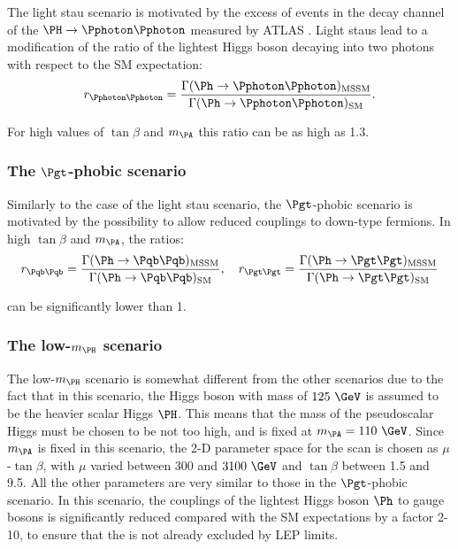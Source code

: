 The light stau scenario is motivated by the excess of events in the decay
channel of the $\PH\to\Pphoton\Pphoton$ measured by ATLAS
\cite{ATLAS-CONF-2013-012}. Light staus
lead to a modification of the ratio of the lightest Higgs boson decaying into
two photons with respect to the \ac{SM} expectation:
\begin{equation}
r_{\Pphoton\Pphoton} =
\frac{\Gamma(\Ph\to\Pphoton\Pphoton)_{\text{MSSM}}}{\Gamma(\Ph\to\Pphoton\Pphoton)_{\text{SM}}}
.
\end{equation}

For high values of $\tan\beta$ and $m_{\PA}$ this ratio can be as high as 1.3. 

\subsubsection{The $\Pgt$-phobic scenario}
\label{sec:tauphobicscenario}

Similarly to the case of the light stau scenario, the $\Pgt$-phobic scenario is
motivated by the possibility to allow reduced couplings to down-type fermions.
In high $\tan\beta$ and $m_{\PA}$, the ratios:
\begin{equation}
r_{\Pqb\Pqb} =
\frac{\Gamma(\Ph\to\Pqb\Pqb)_{\text{MSSM}}}{\Gamma(\Ph\to\Pqb\Pqb)_{\text{SM}}}
, \quad
r_{\Pgt\Pgt} =
\frac{\Gamma(\Ph\to\Pgt\Pgt)_{\text{MSSM}}}{\Gamma(\Ph\to\Pgt\Pgt)_{\text{SM}}}
\end{equation}

can be significantly lower than 1.

\subsubsection{The low-$m_{\PH}$ scenario}
\label{sec:lowmHscenario}

The low-$m_{\PH}$ scenario is somewhat different from the other scenarios due to
the fact that in this scenario, the Higgs boson with mass of $125~\GeV$ is
assumed to be the heavier scalar Higgs $\PH$. This means that the mass of the
pseudoscalar Higgs must be chosen to be not too high, and is fixed at $m_{\PA} =
110~\GeV$. Since $m_{\PA}$ is fixed in this scenario, the 2-D parameter space
for the scan is chosen as $\mu$-$\tan\beta$, with $\mu$ varied between 300 and
$3100~\GeV$ and $\tan\beta$ between 1.5 and 9.5. All the other parameters are
very similar to those in the $\Pgt$-phobic scenario. In this scenario, the
couplings of the lightest Higgs boson $\Ph$ to gauge bosons is significantly
reduced compared with the \ac{SM} expectations by a factor 2-10, to ensure that
the \Ph is not already excluded by LEP limits. 

